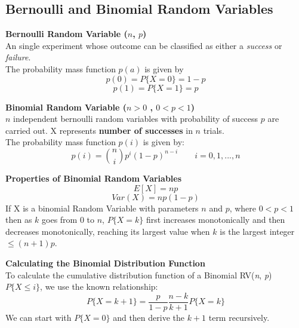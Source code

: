 \documentclass[10pt,a4paper]{article}
\begin{document}
       \subsection{Bernoulli and Binomial Random Variables}
       \begin{framed}
       	\centering\textbf{Bernoulli Random Variable ($n$, $p$)    } \\
       	An single experiment whose outcome can be classified as either a \emph{success} or \emph{failure}. \\ The probability mass function $p(a)$ is given by $$p(0) = P\{X=0\} = 1- p$$ $$p(1) = P\{X=1\} = p$$
       \end{framed}
       \begin{framed}
               	\centering\textbf{Binomial Random Variable ($n > 0$ , $0 < p < 1$)} \\
               	$n$ independent bernoulli random variables with probability of success $p$ are carried out. X represents \textbf{number of successes} in $n$ trials. \\
               	The probability mass function $p(i)$ is given by:
               	$$p(i) = \binom{n}{i}p^{i}(1-p)^{n-i} \qquad i=0,1,...,n $$
               \end{framed}
               \newpage 
               \begin{framed}
               	\centering\textbf{Properties of Binomial Random Variables}
               	$$E[X] = np$$
               	$$Var(X) = np(1-p)$$
               	If X is a binomial Random Variable with parameters $n$ and $p$, where $0 < p < 1$ then as $k$ goes from 0 to $n$, $P\{X=k\}$ first increases monotonically and then decreases monotonically, reaching its largest value when $k$ is the largest integer $\leq (n+1)p$.
               \end{framed}
               \begin{framed}
               	\centering\textbf{Calculating the Binomial Distribution Function} \\
               	To calculate the cumulative distribution function of a Binomial RV(\emph{n}, \emph{p}) $P\{X \leq i\}$, we use the known relationship:
               	$$P\{X=k+1\} = \frac{p}{1-p}\frac{n-k}{k+1}P\{X=k\}$$
               	We can start with $P\{X=0\}$ and then derive the $k+1$ term recursively.
               \end{framed}
\end{document}
